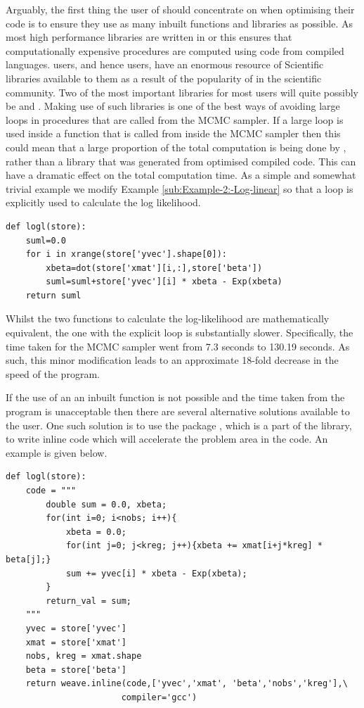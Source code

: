\documentclass[article]{jss}
\begin{document}
Arguably, the first thing the user of  should concentrate
on when optimising their  code is to ensure they use as
many inbuilt functions and libraries as possible. As most high
performance libraries are written in  or
 this ensures that computationally expensive
procedures are computed using code from compiled languages.
 users, and hence  users, have an
enormous resource of Scientific libraries available to them as a
result of the popularity of  in the scientific
community. Two of the most important libraries for most users will
quite possibly be  and . Making use of such
libraries is one of the best ways of avoiding large loops in
procedures that are called from the MCMC sampler. If a large loop is
used inside a function that is called from inside the MCMC sampler
then this could mean that a large proportion of the total computation
is being done by , rather than a library that was
generated from optimised compiled code. This can have a dramatic
effect on the total computation time. As a simple and somewhat trivial
example we modify Example \ref{sub:Example-2:-Log-linear} so that a
loop is explicitly used to calculate the log likelihood.




\begin{lstlisting}[basicstyle={\scriptsize}]
def logl(store):
    suml=0.0
    for i in xrange(store['yvec'].shape[0]):
        xbeta=dot(store['xmat'][i,:],store['beta'])
        suml=suml+store['yvec'][i] * xbeta - Exp(xbeta)
    return suml
\end{lstlisting}


Whilst the two functions to calculate the log-likelihood are
mathematically equivalent, the one with the explicit loop is
substantially slower.  Specifically, the time taken for the MCMC
sampler went from 7.3 seconds to 130.19 seconds. As such, this minor
modification leads to an approximate 18-fold decrease in the speed of
the program.

If the use of an an inbuilt function is not possible and the time
taken from the program is unacceptable then there are several
alternative solutions available to the user. One such solution is to
use the package , which is a part of the 
library, to write inline  code which will accelerate the
problem area in the code. An example is given below.


\begin{lstlisting}[basicstyle={\scriptsize}]
def logl(store):
    code = """     
		double sum = 0.0, xbeta;
		for(int i=0; i<nobs; i++){
			xbeta = 0.0;
			for(int j=0; j<kreg; j++){xbeta += xmat[i+j*kreg] * beta[j];}
			sum += yvec[i] * xbeta - Exp(xbeta);
		}     
		return_val = sum;
    """
    yvec = store['yvec']
    xmat = store['xmat']
	nobs, kreg = xmat.shape
	beta = store['beta']
    return weave.inline(code,['yvec','xmat', 'beta','nobs','kreg'],\ 
                       compiler='gcc')
\end{lstlisting}
\end{document}
